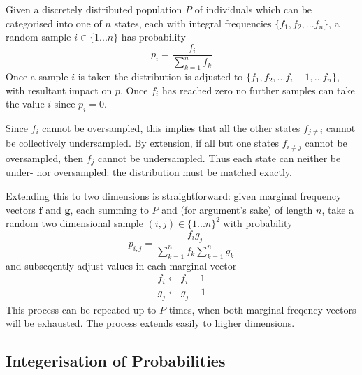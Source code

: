 \documentclass{JASSS}
\begin{document}
Given a discretely distributed population \(P\) of individuals which can be categorised into one of \(n\) states, each with integral frequencies
\(\{f_1,f_2,...f_n\}\), a random sample \(i \in \{1...n\}\) has
probability
\begin{equation}
p_i = \frac{f_i}{\sum\limits_{k=1}^{n}f_k}
\end{equation}
Once a sample \(i\) is taken the distribution is adjusted to
\(\{f_1,f_2,...f_i-1,...f_n\}\), with resultant impact on \(p\). Once
\(f_i\) has reached zero no further samples can take the value \(i\)
since \(p_i = 0\).

Since \(f_i\) cannot be oversampled, this implies that all the other
states \(f_{j\neq{i}}\) cannot be collectively undersampled. By extension, if all but
one states \(f_{i\neq{j}}\) cannot be oversampled, then \(f_j\) cannot
be undersampled. Thus each state can neither be under- nor oversampled:
the distribution must be matched exactly.

Extending this to two dimensions is straightforward: given marginal frequency vectors \(\mathbf{f}\) and \(\mathbf{g}\), each summing to \(P\) and (for argument's sake) of length \(n\), take a random two dimensional sample \((i,j) \in \{1...n\}^2\) with probability
\begin{equation}
p_{i,j} = \frac{f_{i}g_{j}}{\sum\limits_{k=1}^{n}f_k\sum\limits_{k=1}^{n}g_k}
\end{equation}
and subseqently adjust values in each marginal vector
\begin{equation}
\begin{split}
f_i \leftarrow f_i-1 \\
g_j \leftarrow g_j-1 
\end{split}
\end{equation} 
This process can be repeated up to \(P\) times, when both marginal freqency vectors will be exhausted. The process extends easily to higher dimensions.

\subsection{Integerisation of Probabilities}\label{integerisation-of-probabilities}
\end{document}
